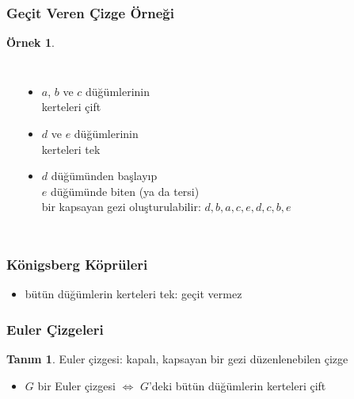 \documentclass[dvipsnames]{beamer}
\theoremstyle{definition}
\newtheorem{tanim}[theorem]{Tanım}
\theoremstyle{example}
\newtheorem{ornek}[theorem]{Örnek}
\theoremstyle{plain}
\begin{document}
\begin{frame}
  \frametitle{Geçit Veren Çizge Örneği}

  \begin{ornek}
    \begin{columns}
      \begin{center}
      \end{center}

      \begin{itemize}
        \item $a$, $b$ ve $c$ düğümlerinin\\
          kerteleri çift
        \item $d$ ve $e$ düğümlerinin\\
          kerteleri tek

        \pause
        \medskip
        \item $d$ düğümünden başlayıp\\
          $e$ düğümünde biten (ya da tersi)\\
          bir kapsayan gezi oluşturulabilir: $d,b,a,c,e,d,c,b,e$
      \end{itemize}
    \end{columns}
  \end{ornek}
\end{frame}

\begin{frame}
  \frametitle{Königsberg Köprüleri}

  \begin{center}
  \end{center}

  \begin{itemize}
    \item bütün düğümlerin kerteleri tek: geçit vermez
  \end{itemize}
\end{frame}

\begin{frame}
  \frametitle{Euler Çizgeleri}

  \begin{tanim}
    \alert{Euler çizgesi}: kapalı, kapsayan bir gezi düzenlenebilen çizge
  \end{tanim}

  \begin{itemize}
    \item $G$ bir Euler çizgesi $\Leftrightarrow$
      $G$'deki bütün düğümlerin kerteleri çift
  \end{itemize}
\end{frame}
\end{document}
